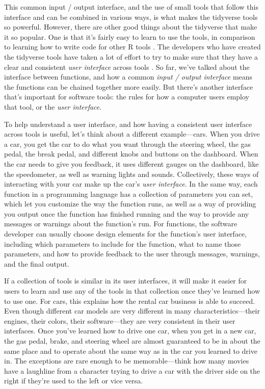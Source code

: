 \documentclass[]{tufte-book}
\begin{document}
This common input / output interface, and the use of small tools that follow
this interface and can be combined in various ways, is what makes the tidyverse
tools so powerful. However, there are other good things about the tidyverse that
make it so popular. One is that it's fairly easy to learn to use the tools, in
comparison to learning how to write code for other R tools \citep{robinson2017teach, peng2018teaching}. The developers who have created the tidyverse tools have
taken a lot of effort to try to make sure that they have a clear and consistent
\emph{user interface} across tools \citep{wickham2017tidy, bryan2017data}. So far, we've
talked about the interface between functions, and how a common \emph{input / output
interface} means the functions can be chained together more easily. But there's
another interface that's important for software tools: the rules for how a
computer users employ that tool, or the \emph{user interface}.

To help understand a user interface, and how having a consistent user interface
across tools is useful, let's think about a different example---cars. When you
drive a car, you get the car to do what you want through the steering wheel, the
gas pedal, the break pedal, and different knobs and buttons on the dashboard.
When the car needs to give you feedback, it uses different gauges on the
dashboard, like the speedometer, as well as warning lights and sounds.
Collectively, these ways of interacting with your car make up the car's \emph{user
interface}. In the same way, each function in a programming language has a
collection of parameters you can set, which let you customize the way the
function runs, as well as a way of providing you output once the function has
finished running and the way to provide any messages or warnings about the
function's run. For functions, the software developer can usually choose design
elements for the function's user interface, including which parameters to
include for the function, what to name those parameters, and how to provide
feedback to the user through messages, warnings, and the final output.

If a collection of tools is similar in its user interfaces, it will make it
easier for users to learn and use any of the tools in that collection once
they've learned how to use one. For cars, this explains how the rental car
business is able to succeed. Even though different car models are very different
in many characteristics---their engines, their colors, their software---they are
very consistent in their user interfaces. Once you've learned how to drive one
car, when you get in a new car, the gas pedal, brake, and steering wheel are
almost guaranteed to be in about the same place and to operate about the same
way as in the car you learned to drive in. The exceptions are rare enough to be
memorable---think how many movies have a laughline from a character trying to
drive a car with the driver side on the right if they're used to the left or
vice versa.
\end{document}
